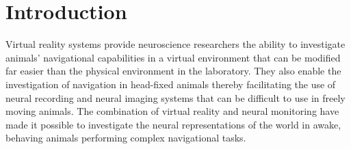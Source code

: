 \documentclass[10pt,letterpaper]{article}
\begin{document}

\linenumbers

\section*{Introduction}
Virtual reality systems provide neuroscience researchers the ability to
investigate animals' navigational capabilities in a virtual environment that
can be modified far easier than the physical environment in the laboratory.
They also enable the investigation of navigation in head-fixed animals thereby
facilitating the use of neural recording and neural imaging systems that can be
difficult to use in freely moving animals.  The combination of virtual reality
and neural monitoring have made it possible to investigate the neural
representations of the world in awake, behaving animals performing complex
navigational tasks.
\end{document}
